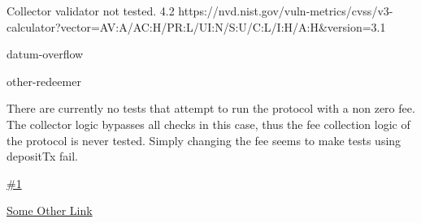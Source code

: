 \vuln
    { %
      Collector validator not tested.
    }
    { %
      4.2
    }
    { %
      https://nvd.nist.gov/vuln-metrics/cvss/v3-calculator?vector=AV:A/AC:H/PR:L/UI:N/S:U/C:L/I:H/A:H&version=3.1
    }
    { %
    \item datum-overflow
    \item other-redeemer
    }
    { %
    There are currently no tests that attempt to run the protocol with a non zero fee. The collector logic bypasses all checks in this case, thus the fee collection logic of the protocol is never tested. Simply changing the fee seems to make tests using depositTx fail.
    }
    { %
      
    }
    { %
    \item\href{github.com}{\#1}
    \item\href{github.com}{Some Other Link}
    }

